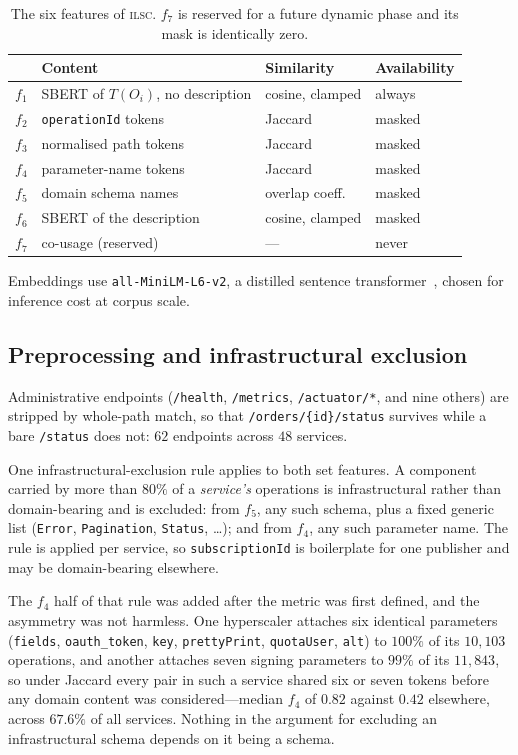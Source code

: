 \documentclass[journal]{IEEEtran}
\newcommand{\ilsc}{\textsc{ilsc}}
\newcommand{\code}[1]{\texttt{\small #1}}
\begin{document}
\begin{table}[!t]
\caption{The six features of \ilsc{}. $f_7$ is reserved for a future dynamic
phase and its mask is identically zero.}
\label{tab:features}
\centering
\footnotesize
\begin{tabular}{@{}llll@{}}
\toprule
& \textbf{Content} & \textbf{Similarity} & \textbf{Availability} \\
\midrule
$f_1$ & SBERT of $T(O_i)$, no description & cosine, clamped & always \\
$f_2$ & \code{operationId} tokens & Jaccard & masked \\
$f_3$ & normalised path tokens & Jaccard & masked \\
$f_4$ & parameter-name tokens & Jaccard & masked \\
$f_5$ & domain schema names & overlap coeff. & masked \\
$f_6$ & SBERT of the description & cosine, clamped & masked \\
$f_7$ & co-usage (reserved) & --- & never \\
\bottomrule
\end{tabular}
\end{table}

Embeddings use \code{all-MiniLM-L6-v2}, a distilled sentence
transformer~\cite{reimers2019sentencebert,wang2020minilm}, chosen for inference
cost at corpus scale.

\subsection{Preprocessing and infrastructural exclusion}
Administrative endpoints (\code{/health}, \code{/metrics},
\code{/actuator/*}, and nine others) are stripped by whole-path match, so that
\code{/orders/\{id\}/status} survives while a bare \code{/status} does not:
$62$ endpoints across $48$ services.

One infrastructural-exclusion rule applies to both set features. A component
carried by more than $80\%$ of a \emph{service's} operations is infrastructural
rather than domain-bearing and is excluded: from $f_5$, any such schema, plus a
fixed generic list (\code{Error}, \code{Pagination}, \code{Status}, \dots); and
from $f_4$, any such parameter name. The rule is applied per service, so
\code{subscriptionId} is boilerplate for one publisher and may be domain-bearing
elsewhere.

The $f_4$ half of that rule was added after the metric was first defined, and
the asymmetry was not harmless. One hyperscaler attaches six identical
parameters (\code{fields}, \code{oauth\_token}, \code{key},
\code{prettyPrint}, \code{quotaUser}, \code{alt}) to $100\%$ of its $10{,}103$
operations, and another attaches seven signing parameters to $99\%$ of its
$11{,}843$, so under Jaccard every pair in such a service shared six or seven
tokens before any domain content was considered---median $f_4$ of $0.82$ against
$0.42$ elsewhere, across $67.6\%$ of all services. Nothing in the argument for
excluding an infrastructural schema depends on it being a schema.
\end{document}
